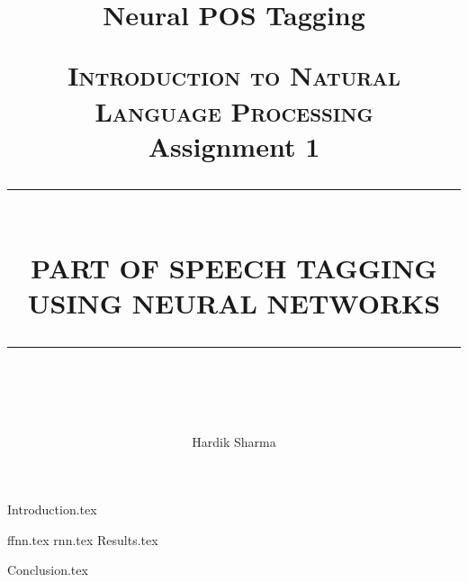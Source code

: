 \documentclass[a4paper,9pt]{report}
\title{Neural POS Tagging }
\newcommand{\HRule}[1]{\rule{\linewidth}{#1}}
\begin{document}
\title{ \normalsize \textsc{\LARGE Introduction to Natural Language Processing}
		\\ [2.0cm]
        \LARGE Assignment 1 
		\HRule{0.5pt} \\
		\LARGE \textbf{\uppercase{Part of Speech Tagging using Neural Networks}}
		\HRule{2pt} \\ [0.5cm]
		\normalsize \vspace*{3\baselineskip}}
        \date{ }

\author{Hardik Sharma}

\maketitle

%
%

{Introduction.tex}

{ffnn.tex}
%
{rnn.tex}
%
\newpage
{Results.tex}
%

{Conclusion.tex}
\end{document}
